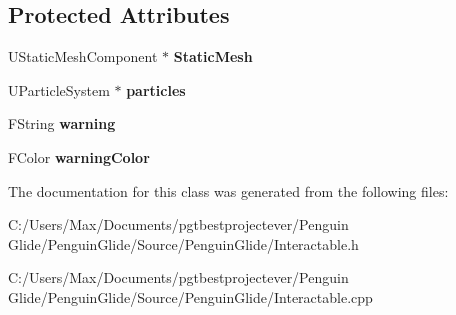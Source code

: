 \subsection*{Protected Attributes}
\begin{DoxyCompactItemize}
\item 
\mbox{\label{class_a_interactable_ac479c0a70f57689b798fc15b2ad0c324}} 
U\+Static\+Mesh\+Component $\ast$ {\bfseries Static\+Mesh}
\item 
\mbox{\label{class_a_interactable_aa10017f1987a0fb80dcad96bbd1ddb16}} 
U\+Particle\+System $\ast$ {\bfseries particles}
\item 
\mbox{\label{class_a_interactable_ac286db2b4d096591ce93fa653e6410b9}} 
F\+String {\bfseries warning}
\item 
\mbox{\label{class_a_interactable_a52d9ed98781301df4b341802e2356bea}} 
F\+Color {\bfseries warning\+Color}
\end{DoxyCompactItemize}


The documentation for this class was generated from the following files\+:\begin{DoxyCompactItemize}
\item 
C\+:/\+Users/\+Max/\+Documents/pgtbestprojectever/\+Penguin Glide/\+Penguin\+Glide/\+Source/\+Penguin\+Glide/Interactable.\+h\item 
C\+:/\+Users/\+Max/\+Documents/pgtbestprojectever/\+Penguin Glide/\+Penguin\+Glide/\+Source/\+Penguin\+Glide/Interactable.\+cpp\end{DoxyCompactItemize}
